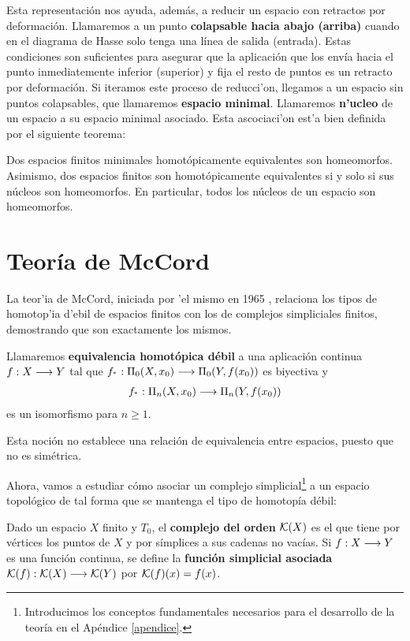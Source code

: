 Esta representación nos ayuda, además, a reducir un espacio con retractos por deformación. Llamaremos a un punto \textbf{colapsable hacia abajo (arriba)} cuando en el diagrama de Hasse solo tenga una línea de salida (entrada). Estas condiciones son suficientes para asegurar que la aplicación que los envía hacia el punto inmediatemente inferior (superior) y fija el resto de puntos es un retracto por deformación. Si iteramos este proceso de reducci'on, llegamos a un espacio sin puntos colapsables, que llamaremos \textbf{espacio minimal}. Llamaremos \textbf{n'ucleo} de un espacio a su espacio minimal asociado. Esta ascociaci'on est'a bien definida por el siguiente teorema:

\begin{theorem}\label{clasif}
  Dos espacios finitos minimales homotópicamente equivalentes son homeomorfos. Asimismo, dos espacios finitos son homotópicamente equivalentes si y solo si sus núcleos son homeomorfos. En particular, todos los núcleos de un espacio son homeomorfos.
\end{theorem}




\section{Teoría de McCord}

La teor'ia de McCord, iniciada por 'el mismo en 1965 \cite{mccord}, relaciona los tipos de homotop'ia d'ebil de espacios finitos con los de complejos simpliciales finitos, demostrando que son exactamente los mismos.
                       
\begin{definition}
  Llamaremos \textbf{equivalencia homotópica débil} a una aplicación continua $ f:X\longrightarrow Y $ tal que $ f_{^*} :\Pi_0(X,x_0)\longrightarrow \Pi_0(Y,f(x_0)) $ es biyectiva y 
  \begin{gather*}
    f_{^*} :\Pi_n(X,x_0)\longrightarrow \Pi_n(Y,f(x_0))
  \end{gather*}
  es un isomorfismo para $ n\geq 1 $.
\end{definition}

Esta noción  no establece una relación de equivalencia entre espacios, puesto que no es simétrica.

Ahora, vamos a estudiar cómo asociar un complejo simplicial\footnote{Introducimos los conceptos fundamentales necesarios para el desarrollo de la teoría en el Apéndice \ref{apendice}.} a un espacio topológico de tal forma que se mantenga el tipo de homotopía débil:
\begin{definition}
  Dado un espacio $ X $ finito y $ T_0 $, el \textbf{complejo del orden} $ \mathcal{K}(X) $ es el que tiene por vértices los puntos de $X$ y por símplices a sus cadenas no vacías. Si $ f:X\longrightarrow Y $ es una función continua, se define la \textbf{función simplicial asociada} $ \mathcal{K}(f):\mathcal{K}(X)\longrightarrow \mathcal{K}(Y) $ por $ \mathcal{K}(f)(x)=f(x)  $.
\end{definition}





